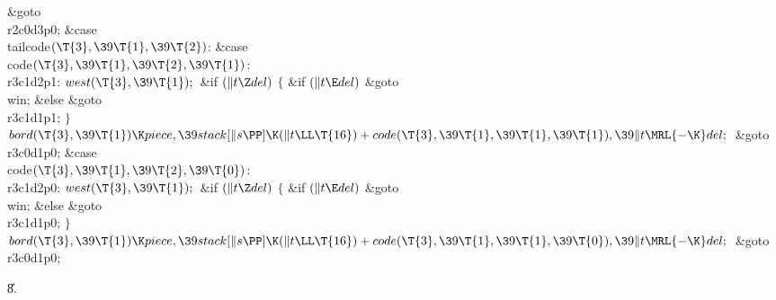 \&{goto} \\{r2c0d3p0};\6
\4\&{case} \\{tailcode}${}(\T{3},\39\T{1},\39\T{2}){}$:\5
\&{case} \\{code}${}(\T{3},\39\T{1},\39\T{2},\39\T{1}){}$:\5
\\{r3c1d2p1}:\5
${}\\{west}(\T{3},\39\T{1});{}$\6
\&{if} ${}(\|t\Z\\{del}){}$\5
${}\{{}$\5
\1\&{if} ${}(\|t\E\\{del}){}$\1\5
\&{goto} \\{win};\5
\2\&{else}\1\5
\&{goto} \\{r3c1d1p1};\5
\2${}\}{}$\2\6
${}\\{bord}(\T{3},\39\T{1})\K\\{piece},\39\\{stack}[\|s\PP]\K(\|t\LL\T{16})+%
\\{code}(\T{3},\39\T{1},\39\T{1},\39\T{1}),\39\|t\MRL{-{\K}}\\{del};{}$\6
\&{goto} \\{r3c0d1p0};\6
\4\&{case} \\{code}${}(\T{3},\39\T{1},\39\T{2},\39\T{0}){}$:\5
\\{r3c1d2p0}:\5
${}\\{west}(\T{3},\39\T{1});{}$\6
\&{if} ${}(\|t\Z\\{del}){}$\5
${}\{{}$\5
\1\&{if} ${}(\|t\E\\{del}){}$\1\5
\&{goto} \\{win};\5
\2\&{else}\1\5
\&{goto} \\{r3c1d1p0};\5
\2${}\}{}$\2\6
${}\\{bord}(\T{3},\39\T{1})\K\\{piece},\39\\{stack}[\|s\PP]\K(\|t\LL\T{16})+%
\\{code}(\T{3},\39\T{1},\39\T{1},\39\T{0}),\39\|t\MRL{-{\K}}\\{del};{}$\6
\&{goto} \\{r3c0d1p0};\par
\U8.\fi

